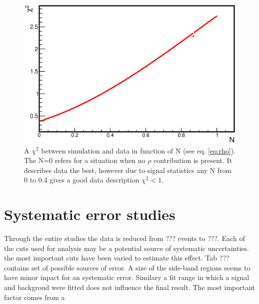 \begin{figure}[h]
  \centering
  \includegraphics[width=0.9 \linewidth]{Chapter_analysis/chi2.eps}
  \caption{A $\chi^2$ between simulation and data in function of N (see eq. \ref{eq:rho}). The N=0 refers for a situation when no $\rho$ contribution is present. It describes data the best, however due to signal statistics any N from 0 to 0.4 gives a good data description $\chi^2<1$.}
  \label{fig:chi2}
\end{figure}

\section{Systematic error studies}
Through the entire studies the data is reduced from ??? events to ???. Each of the cuts used for analysis may be a potential source of systematic uncertainties. the most important cuts have been varied to estimate this effect. Tab ??? contains set of possible sources of error. A size of the side-band regions seems to have minor inpact for an systematic error. Similary a fit range in which a signal and backgroud were fitted does not influence the final result. The most important factor comes from a  